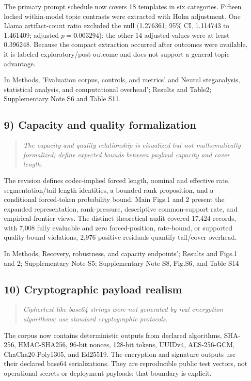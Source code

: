 \documentclass[11pt]{article}
\newenvironment{reviewcomment}{\begin{quote}\color{commentgray}\itshape}{\end{quote}}
\begin{document}
The primary prompt schedule now covers 18 templates in six categories. Fifteen locked within-model topic contrasts were extracted with Holm adjustment. One Llama artifact-count ratio excluded the null (1.276361; 95\% CI, 1.114743 to 1.461409; adjusted \(p=0.003294\)); the other 14 adjusted values were at least 0.396248. Because the compact extraction occurred after outcomes were available, it is labeled exploratory/post-outcome and does not support a general topic advantage.

In Methods, 'Evaluation corpus, controls, and metrics' and Neural steganalysis, statistical analysis, and computational overhead'; Results and Table2; Supplementary Note S6 and Table S11.

\subsection*{9) Capacity and quality formalization}
\begin{reviewcomment}
The capacity and quality relationship is visualized but not mathematically formalized; define expected bounds between payload capacity and cover length.
\end{reviewcomment}

The revision defines codec-implied forced length, nominal and effective rate, segmentation/tail length identities, a bounded-rank proposition, and a conditional forced-token probability bound. Main Figs.1 and 2 present the expanded representation, rank-pressure, descriptive common-support rate, and empirical-frontier views. The distinct theoretical audit covered 17,424 records, with 7,008 fully evaluable and zero forced-position, rate-bound, or supported quality-bound violations, 2,976 positive residuals quantify tail/cover overhead. 

In Methods, Recovery, robustness, and capacity endpoints'; Results and Figs.1 and 2; Supplementary Note S5; Supplementary Note S8, Fig.S6, and Table S14

\subsection*{10) Cryptographic payload realism}
\begin{reviewcomment}
Ciphertext-like base64 strings were not generated by real encryption algorithms; use standard cryptographic protocols.
\end{reviewcomment}

The corpus now contains deterministic outputs from declared algorithms, SHA-256, HMAC-SHA256, 96-bit nonces, 128-bit tokens, UUIDv4, AES-256-GCM, ChaCha20-Poly1305, and Ed25519. The encryption and signature outputs use their declared base64 serializations. They are reproducible public test vectors, not operational secrets or deployment payloads; that boundary is explicit.
\end{document}
